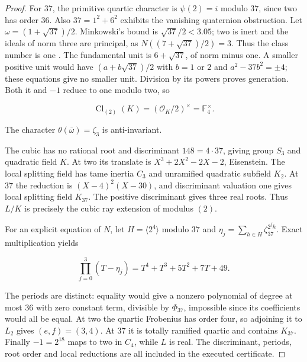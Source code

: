 \begin{proof}
For $37$, the primitive quartic character is $\psi(2)=i$
modulo $37$, since two has order $36$.
Also $37=1^2+6^2$ exhibits the vanishing quaternion obstruction.
Let $\omega=(1+\sqrt{37})/2$.
Minkowski's bound is $\sqrt{37}/2<3.05$;
two is inert and the ideals of norm three are principal,
as $N((7+\sqrt{37})/2)=3$.
Thus the class number is one
\cite[Theorem 4.3]{D_MilneANT}.
The fundamental unit is $6+\sqrt{37}$, of norm minus one.
A smaller positive unit would have
$(a+b\sqrt{37})/2$ with $b=1$ or $2$ and
$a^2-37b^2=\pm4$; these equations give no smaller unit.
Division by its powers proves generation.
Both it and $-1$ reduce to one modulo two, so

$$
\operatorname{Cl}_{(2)}(K)=
 (\mathcal O_K/2)^\times=\mathbb F_4^\times.
$$

The character $\theta(\bar\omega)=\zeta_3$ is anti-invariant.

The cubic has no rational root and discriminant
$148=4\cdot37$, giving group $S_3$ and quadratic field $K$.
At two its translate is $X^3+2X^2-2X-2$, Eisenstein.
The local splitting field has tame inertia $C_3$ and
unramified quadratic subfield $K_2$.
At $37$ the reduction is $(X-4)^2(X-30)$,
and discriminant valuation one gives local splitting field
$K_{37}$. The positive discriminant gives three real roots.
Thus $L/K$ is precisely the cubic ray extension of modulus $(2)$.

For an explicit equation of $N$, let $H=\langle2^4\rangle$
modulo $37$ and $\eta_j=\sum_{h\in H}\zeta_{37}^{2^jh}$.
Exact multiplication yields

$$
\prod_{j=0}^3(T-\eta_j)=T^4+T^3+5T^2+7T+49.
$$

The periods are distinct: equality would give a nonzero
polynomial of degree at most $36$ with zero constant term,
divisible by $\Phi_{37}$, impossible since its coefficients
would all be equal.
At two the quartic Frobenius has order four, so adjoining it
to $L_2$ gives $(e,f)=(3,4)$.
At $37$ it is totally ramified quartic and contains $K_{37}$.
Finally $-1=2^{18}$ maps to two in $C_4$, while $L$ is real.
The discriminant, periods, root order and local reductions
are all included in the executed certificate.
\end{proof}


